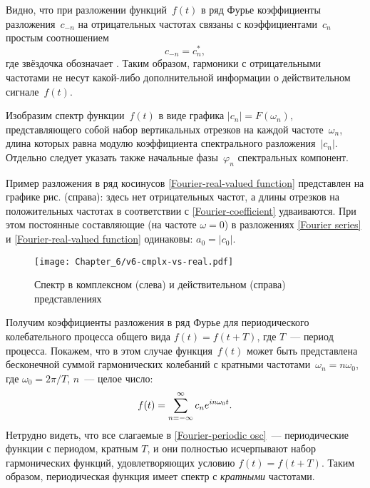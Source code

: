 Видно, что при разложении  функций~$f(t)$ в ряд Фурье
коэффициенты разложения~$c_{-n}$ на отрицательных
частотах связаны с коэффициентами~$c_n$ простым соотношением
\begin{equation*}
c_{-n}=c_{n}^*,
\end{equation*}
где звёздочка обозначает .
Таким образом, гармоники с отрицательными частотами не несут какой-либо
дополнительной информации о действительном сигнале~$f(t)$.

Изобразим спектр функции~$f(t)$ в виде графика $|c_n|=F(\omega_n)$, 
представляющего собой набор вертикальных отрезков на каждой частоте~$\omega_n$, 
длина которых равна модулю коэффициента спектрального разложения~$|c_n|$.
Отдельно следует указать также начальные фазы~$\varphi_n$ 
спектральных компонент.

Пример разложения в ряд косинусов \eqref{Fourier-real-valued function} 
представлен на графике рис.  (справа): здесь нет
отрицательных частот, а длины отрезков на положительных частотах в соответствии с
\eqref{Fourier-coefficient} удваиваются. При этом постоянные составляющие
(на частоте $\omega=0$) в разложениях \eqref{Fourier series} и
\eqref{Fourier-real-valued function} одинаковы: $a_0=|c_0|$.

\begin{figure}[ht]
    \centering\texttt{[image: Chapter\_6/v6-cmplx-vs-real.pdf]}
    \caption{Спектр в комплексном (слева) и действительном (справа) представлениях}
\end{figure}

\label{sec:spectrum-periodic}
Получим коэффициенты разложения в ряд Фурье для периодического колебательного
процесса общего вида $f(t)=f(t+T)$, где $T$~--- период процесса.
Покажем, что в этом случае функция~$f(t)$ может быть представлена
бесконечной суммой гармонических колебаний с кратными частотами~$\omega_n=n\omega_0$,
где $\omega_0=2\pi/T$, $n$~--- целое число:
\begin{equation}
    \eqmark{Fourier-periodic osc}
    f(t)=\sum_{n=-\infty}^{\infty} c_n e^{in\omega_0 t}.
\end{equation}
Нетрудно видеть, что все слагаемые в \eqref{Fourier-periodic osc}~---
периодические функции с периодом, кратным $T$, и они полностью исчерпывают
набор гармонических функций, удовлетворяющих условию $f(t)=f(t+T)$.
Таким образом, периодическая функция имеет 
спектр с \emph{кратными} частотами.

